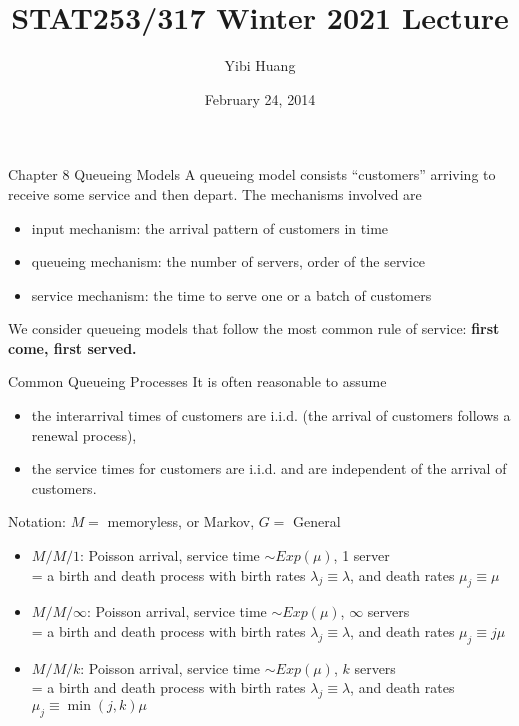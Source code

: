 \documentclass[letterpaper,handout]{beamer}
\title{STAT253/317 Winter 2021 Lecture \chapnum} \date{February 24, 2014} \author{Yibi Huang}
\begin{document}
\begin{frame}{Chapter 8\; Queueing Models}
A queueing model consists ``customers'' arriving to receive some service and then depart. The mechanisms involved are
\begin{itemize}
\item input mechanism: the arrival pattern of customers in time
\item queueing mechanism: the number of servers, order of the service
\item service mechanism: the time to serve one or a batch of customers
\end{itemize}
We consider queueing models that follow the most common rule of service: \textbf{first come, first served.}
\end{frame}
\begin{frame}{Common Queueing Processes}
It is often reasonable to assume
\begin{itemize}
\item the interarrival times of customers are i.i.d. (the arrival of customers follows a renewal process),
\item the service times for customers are i.i.d. and are independent of the arrival of customers.
\end{itemize}

Notation: $M=$ memoryless, or Markov, $G=$ General
\begin{itemize}
\item $M/M/1$: Poisson arrival, service time $\sim Exp(\mu)$, 1 server\\
= a birth and death process with birth rates $\lambda_j\equiv \lambda$, and death rates $\mu_j\equiv \mu$
\item $M/M/\infty$: Poisson arrival, service time $\sim Exp(\mu)$, $\infty$ servers\\
= a birth and death process with birth rates $\lambda_j\equiv \lambda$, and death rates $\mu_j\equiv j\mu$
\item $M/M/k$: Poisson arrival, service time $\sim Exp(\mu)$, $k$ servers\\
= a birth and death process with birth rates $\lambda_j\equiv \lambda$, and death rates $\mu_j\equiv \min(j,k)\mu$
\end{itemize}
\end{frame}
\end{document}
